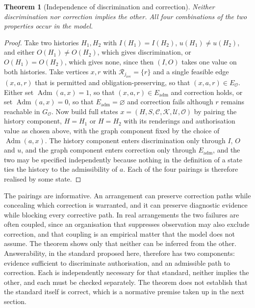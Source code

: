 \documentclass[11pt]{article}
\newtheorem{theorem}{Theorem}
\theoremstyle{definition}
\theoremstyle{remark}
\newcommand{\Adm}{\operatorname{Adm}}
\begin{document}
\begin{theorem}[Independence of discrimination and correction]\label{thm:twofail}
Neither discrimination nor correction implies the other. All four combinations of the two properties occur in the model.
\end{theorem}
\begin{proof}
Take two histories $H_1,H_2$ with $I(H_1)=I(H_2)$, $u(H_1)\neq u(H_2)$, and either $O(H_1)\neq O(H_2)$, which gives discrimination, or $O(H_1)=O(H_2)$, which gives none, since then $(I,O)$ takes one value on both histories. Take vertices $x,r$ with $\mathcal R_{j_{\mathrm{rev}}}=\{r\}$ and a single feasible edge $(x,a,r)$ that is permitted and obligation-preserving, so that $(x,a,r)\in E_{\mathcal O}$. Either set $\Adm(a,x)=1$, so that $(x,a,r)\in E_{\mathrm{adm}}$ and correction holds, or set $\Adm(a,x)=0$, so that $E_{\mathrm{adm}}=\varnothing$ and correction fails although $r$ remains reachable in $G_{\mathcal O}$. Now build full states $x=(H,S,\mathcal C,\mathcal K,\mathcal U,\mathcal O)$ by pairing the history component, $H=H_1$ or $H=H_2$ with its renderings and authorisation value as chosen above, with the graph component fixed by the choice of $\Adm(a,x)$. The history component enters discrimination only through $I$, $O$ and $u$, and the graph component enters correction only through $E_{\mathrm{adm}}$, and the two may be specified independently because nothing in the definition of a state ties the history to the admissibility of $a$. Each of the four pairings is therefore realised by some state. \qedhere
\end{proof}

The pairings are informative. An arrangement can preserve correction paths while concealing which correction is warranted, and it can preserve diagnostic evidence while blocking every corrective path. In real arrangements the two failures are often coupled, since an organisation that suppresses observation may also exclude correction, and that coupling is an empirical matter that the model does not assume. The theorem shows only that neither can be inferred from the other. Answerability, in the standard proposed here, therefore has two components: evidence sufficient to discriminate authorisation, and an admissible path to correction. Each is independently necessary for that standard, neither implies the other, and each must be checked separately. The theorem does not establish that the standard itself is correct, which is a normative premise taken up in the next section.
\end{document}
